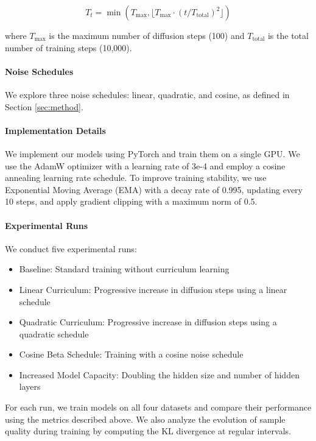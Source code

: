\documentclass{article} %
\begin{document}
\begin{equation}
    T_t = \min(T_{\max}, \lfloor T_{\max} \cdot (t / T_{\text{total}})^{2} \rfloor)
\end{equation}

where $T_{\max}$ is the maximum number of diffusion steps (100) and $T_{\text{total}}$ is the total number of training steps (10,000).

\paragraph{Noise Schedules} We explore three noise schedules: linear, quadratic, and cosine, as defined in Section \ref{sec:method}.

\paragraph{Implementation Details} We implement our models using PyTorch and train them on a single GPU. We use the AdamW optimizer with a learning rate of 3e-4 and employ a cosine annealing learning rate schedule. To improve training stability, we use Exponential Moving Average (EMA) with a decay rate of 0.995, updating every 10 steps, and apply gradient clipping with a maximum norm of 0.5.

\paragraph{Experimental Runs} We conduct five experimental runs:
\begin{itemize}
    \item Baseline: Standard training without curriculum learning
    \item Linear Curriculum: Progressive increase in diffusion steps using a linear schedule
    \item Quadratic Curriculum: Progressive increase in diffusion steps using a quadratic schedule
    \item Cosine Beta Schedule: Training with a cosine noise schedule
    \item Increased Model Capacity: Doubling the hidden size and number of hidden layers
\end{itemize}

For each run, we train models on all four datasets and compare their performance using the metrics described above. We also analyze the evolution of sample quality during training by computing the KL divergence at regular intervals.
\end{document}
